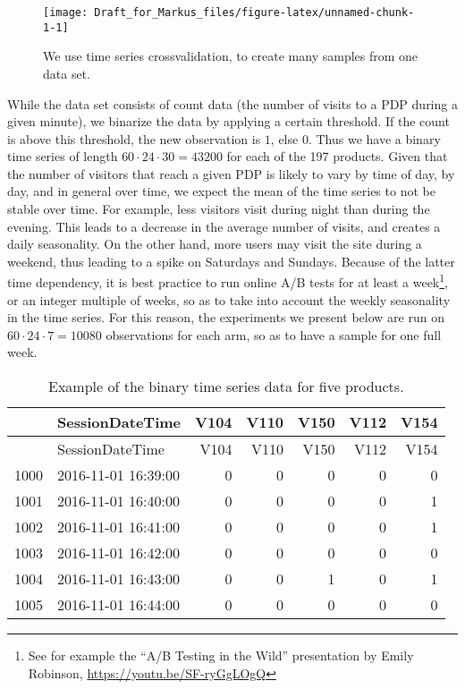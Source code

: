 \documentclass[11pt,]{article}
\let\rmarkdownfootnote\footnote%
\def\footnote{\protect\rmarkdownfootnote}
\begin{document}
\begin{figure}

{\centering \texttt{[image: Draft\_for\_Markus\_files/figure-latex/unnamed-chunk-1-1]} 

}

\caption{We use time series crossvalidation, to create many samples from one data set.}\label{fig:unnamed-chunk-1}
\end{figure}

While the data set consists of count data (the number of visits to a PDP
during a given minute), we binarize the data by applying a certain
threshold. If the count is above this threshold, the new observation is
\(1\), else \(0\). Thus we have a binary time series of length
\(60\cdot 24 \cdot 30 = 43200\) for each of the 197 products. Given that
the number of visitors that reach a given PDP is likely to vary by time
of day, by day, and in general over time, we expect the mean of the time
series to not be stable over time. For example, less visitors visit
during night than during the evening. This leads to a decrease in the
average number of visits, and creates a daily seasonality. On the other
hand, more users may visit the site during a weekend, thus leading to a
spike on Saturdays and Sundays. Because of the latter time dependency,
it is best practice to run online A/B tests for at least a
week\footnote{See for example the ``A/B Testing in the Wild''
  presentation by Emily Robinson, \url{https://youtu.be/SF-ryGgLOgQ}},
or an integer multiple of weeks, so as to take into account the weekly
seasonality in the time series. For this reason, the experiments we
present below are run on \(60 \cdot 24 \cdot 7 = 10080\) observations
for each arm, so as to have a sample for one full week.

\begin{longtable}[]{@{}llrrrrr@{}}
\caption{Example of the binary time series data for five
products.}\tabularnewline
\toprule
& SessionDateTime & V104 & V110 & V150 & V112 & V154\tabularnewline
\midrule
\endfirsthead
\toprule
& SessionDateTime & V104 & V110 & V150 & V112 & V154\tabularnewline
\midrule
\endhead
1000 & 2016-11-01 16:39:00 & 0 & 0 & 0 & 0 & 0\tabularnewline
1001 & 2016-11-01 16:40:00 & 0 & 0 & 0 & 0 & 1\tabularnewline
1002 & 2016-11-01 16:41:00 & 0 & 0 & 0 & 0 & 1\tabularnewline
1003 & 2016-11-01 16:42:00 & 0 & 0 & 0 & 0 & 0\tabularnewline
1004 & 2016-11-01 16:43:00 & 0 & 0 & 1 & 0 & 1\tabularnewline
1005 & 2016-11-01 16:44:00 & 0 & 0 & 0 & 0 & 0\tabularnewline
\bottomrule
\end{longtable}
\end{document}
